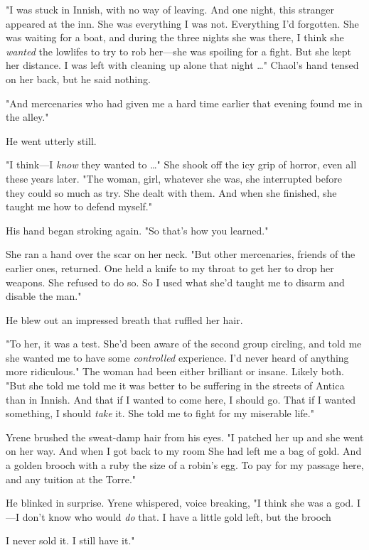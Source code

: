 "I was stuck in Innish, with no way of leaving. And one night, this stranger appeared at the inn. She was  everything I was not. Everything I'd forgotten. She was waiting for a boat, and during the three nights she was there, I think she \emph{wanted} the lowlifes to try to rob her---she was spoiling for a fight. But she kept her distance. I was left with cleaning up alone that night \ldots" Chaol's hand tensed on her back, but he said nothing.

"And mercenaries who had given me a hard time earlier that evening found me in the alley."

He went utterly still.

"I think---I \emph{know} they wanted to \ldots" She shook off the icy grip of horror, even all these years later. "The woman, girl, whatever she was, she interrupted before they could so much as try. She 
dealt with them. And when she finished, she taught me how to defend myself."

His hand began stroking again. "So that's how you learned."

She ran a hand over the scar on her neck. "But other mercenaries, friends of the earlier ones, returned. One held a knife to my throat to get her to drop her weapons. She refused to do so. So I used what she'd taught me to disarm and disable the man."

He blew out an impressed breath that ruffled her hair.

"To her, it was a test. She'd been aware of the second group circling, and told me she wanted me to have some \emph{controlled} experience. I'd never heard of anything more ridiculous." The woman had been either brilliant or insane. Likely both. "But she told me  told me it was better to be suffering in the streets of Antica than in Innish. And that if I wanted to come here, I should go. That if I wanted something, I should \emph{take} it. She told me to fight for my miserable life."

Yrene brushed the sweat-damp hair from his eyes. "I patched her up and she went on her way. And when I got back to my room  She had left me a bag of gold. And a golden brooch with a ruby the size of a robin's egg. To pay for my passage here, and any tuition at the Torre."

He blinked in surprise. Yrene whispered, voice breaking, "I think she was a god. I---I don't know who would \emph{do} that. I have a little gold left, but the brooch

 I never sold it. I still have it."

